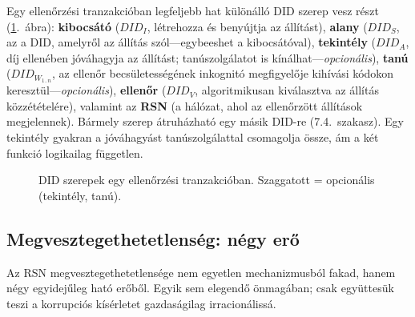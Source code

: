 \documentclass[11pt,a4paper,twocolumn]{article}
\begin{document}
Egy ellenőrzési tranzakcióban legfeljebb hat különálló DID szerep vesz részt (\ref{fig:roles}.~ábra): \textbf{kibocsátó} ($DID_I$, létrehozza és benyújtja az állítást), \textbf{alany} ($DID_S$, az a DID, amelyről az állítás szól---egybeeshet a kibocsátóval), \textbf{tekintély} ($DID_A$, díj ellenében jóváhagyja az állítást; tanúszolgálatot is kínálhat---\emph{opcionális}), \textbf{tanú} ($DID_{W_{1..n}}$, az ellenőr becsületességének inkognitó megfigyelője kihívási kódokon keresztül---\emph{opcionális}), \textbf{ellenőr} ($DID_V$, algoritmikusan kiválasztva az állítás közzétételére), valamint az \textbf{RSN} (a hálózat, ahol az ellenőrzött állítások megjelennek). Bármely szerep átruházható egy másik DID-re (7.4.~szakasz). Egy tekintély gyakran a jóváhagyást tanúszolgálattal csomagolja össze, ám a két funkció logikailag független.

\begin{figure}[ht]
\centering
{}
\caption{DID szerepek egy ellenőrzési tranzakcióban. Szaggatott = opcionális (tekintély, tanú).}
\label{fig:roles}
\end{figure}

\subsection{Megvesztegethetetlenség: négy erő}

Az RSN megvesztegethetetlensége nem egyetlen mechanizmusból fakad, hanem négy egyidejűleg ható erőből. Egyik sem elegendő önmagában; csak együttesük teszi a korrupciós kísérletet gazdaságilag irracionálissá.
\end{document}
